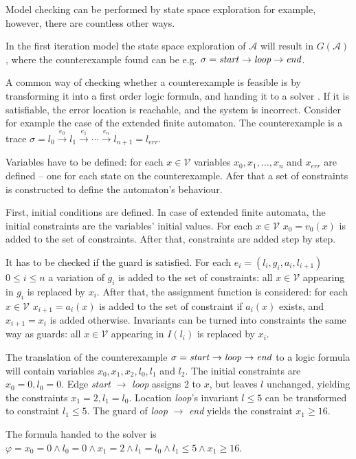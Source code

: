 Model checking can be performed by state space exploration for example, however, there are countless other ways.

 \begin{example}
 	In the first iteration model the state space exploration of $\mathcal{A}$ will result in $G(\mathcal{A})$, where the counterexample found can be e.g. $\sigma = \text{\emph{start}} \to \text{\emph{loop}} \to \text{\emph{end}}$.
 \end{example}
 
 A common way of checking whether a counterexample  is feasible is by transforming it into a first order logic formula, and handing it to a solver \cite{BCCZ99}. If it is satisfiable, the error location is reachable, and the system is incorrect. Consider for example the case of the extended finite automaton. The counterexample is a trace $\sigma = l_0 \xrightarrow{e_0} l_1 \xrightarrow{e_1} \cdots \xrightarrow{e_n} l_{n+1}=l_{err}$.

Variables have to be defined: for each $x \in \mathcal{V}$ variables $x_0,x_1, \dots, x_n$ and $x_{err}$ are defined -- one for each state on the counterexample. Afer that a set of constraints is constructed to define the automaton's behaviour. 

First, initial conditions are defined. In case of extended finite automata, the initial constraints are the variables' initial values. For each $x \in \mathcal{V}$ $x_0=v_0(x)$ is added to the set of constraints. After that, constraints are added step by step. 

It has to be checked if the guard is satisfied. For each $e_i=(l_i,g_i,a_i,l_{i+1})$ $0 \leq i \leq n$ a variation of $g_i$ is added to the set of constraints: all $x \in \mathcal{V}$ appearing in $g_i$ is replaced by $x_i$. After that, the assignment function is considered: for each $x \in \mathcal{V}$ $x_{i+1}=a_i(x)$ is added to the set of constraint if $a_i(x)$ exists, and $x_{i+1}=x_i$ is added otherwise. Invariants can be turned into constraints the same way as guards: all $x \in \mathcal{V}$ appearing in $I(l_i)$ is replaced by $x_i$. 

\begin{example}
	The translation of the counterexample $\sigma = \text{\emph{start}} \to \text{\emph{loop}} \to \text{\emph{end}}$ to a logic formula will contain variables $x_0,x_1,x_2,l_0,l_1$ and $l_2$. The initial constraints are $x_0=0,l_0=0$. Edge \emph{start} $\to$ \emph{loop} assigns 2 to $x$, but leaves $l$ unchanged, yielding the constraints $x_1=2,l_1=l_0$. Location \emph{loop}'s invariant $l \leq 5$ can be transformed to constraint $l_1 \leq 5$. The guard of \emph{loop} $\to$ \emph{end} yields the constraint $x_1 \geq 16$.
	
	The formula handed to the solver is $\varphi = x_0=0 \wedge l_0=0 \wedge x_1=2 \wedge l_1=l_0 \wedge l_1 \leq 5 \wedge x_1 \geq 16$.
\end{example}

